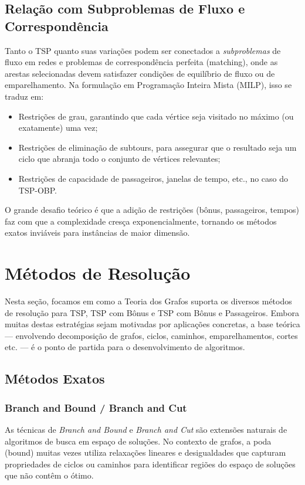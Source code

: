 \documentclass[12pt, a4paper]{report}
\begin{document}
\section{Relação com Subproblemas de Fluxo e Correspondência}
Tanto o TSP quanto suas variações podem ser conectados a \textit{subproblemas} de fluxo em redes e problemas de correspondência perfeita (matching), onde as arestas selecionadas devem satisfazer condições de equilíbrio de fluxo ou de emparelhamento. Na formulação em Programação Inteira Mista (MILP), isso se traduz em:
\begin{itemize}
    \item Restrições de grau, garantindo que cada vértice seja visitado no máximo (ou exatamente) uma vez;
    \item Restrições de eliminação de subtours, para assegurar que o resultado seja um ciclo que abranja todo o conjunto de vértices relevantes;
    \item Restrições de capacidade de passageiros, janelas de tempo, etc., no caso do TSP-OBP.
\end{itemize}

O grande desafio teórico é que a adição de restrições (bônus, passageiros, tempos) faz com que a complexidade cresça exponencialmente, tornando os métodos exatos inviáveis para instâncias de maior dimensão.

\chapter{Métodos de Resolução}
Nesta seção, focamos em como a Teoria dos Grafos suporta os diversos métodos de resolução para TSP, TSP com Bônus e TSP com Bônus e Passageiros. Embora muitas destas estratégias sejam motivadas por aplicações concretas, a base teórica — envolvendo decomposição de grafos, ciclos, caminhos, emparelhamentos, cortes etc. — é o ponto de partida para o desenvolvimento de algoritmos.

\section{Métodos Exatos}
\subsection{Branch and Bound / Branch and Cut}
As técnicas de \textit{Branch and Bound} e \textit{Branch and Cut} são extensões naturais de algoritmos de busca em espaço de soluções. No contexto de grafos, a poda (bound) muitas vezes utiliza relaxações lineares e desigualdades que capturam propriedades de ciclos ou caminhos para identificar regiões do espaço de soluções que não contêm o ótimo.
\end{document}
